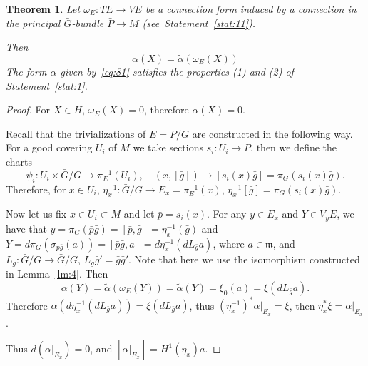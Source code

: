 \documentclass[12pt,letterpaper]{amsart}
\theoremstyle{definition}
\theoremstyle{plain}
\newtheorem{thm}{Theorem}
\theoremstyle{remark}
\begin{document}
\begin{thm}
Let $\omega_E: TE \rightarrow VE$ be a connection form induced by a connection in the principal $\bar{G}$-bundle $\bar{P} \to M$ (see~Statement~\ref{stat:11}). 

Then
\begin{equation}
\alpha(X)=\tilde{\alpha}(\omega_E(X))
\label{eq:81}
\end{equation}
The form $\alpha$ given by~\eqref{eq:81} satisfies the properties (1) and (2) of Statement~\ref{stat:1}.
\label{thm:4}
\end{thm}
\begin{proof}
For $X \in H$, $\omega_E(X) = 0$, therefore $\alpha(X) = 0$.

Recall that the trivializations of $E = P/G$ are constructed in the following way.
For a good covering $U_i$ of $M$ we take sections $s_i : U_i \to P$, then we define the charts
\begin{equation}
\psi_i : U_i \times \bar{G}/G \to \pi_E^{-1}(U_i), \quad (x, [\bar{g}]) \to [s_i(x) \bar{g}] = \pi_G(s_i(x) \bar{g}).
\label{eq:82}
\end{equation}
Therefore, for $x \in U_i$, $\eta_x^{-1} : \bar{G}/G \to E_x = \pi_E^{-1}(x)$, $\eta_x^{-1}[\bar{g}] = \pi_G(s_i(x)\bar{g})$.

Now let us fix $x \in U_i \subset M$ and let $\bar{p} = s_i(x)$.
For any $y \in E_x$ and $Y \in V_yE$, we have that $y = \pi_G(\bar{p} \bar{g}) = [\bar{p}, \bar{g}] = \eta_x^{-1}(\bar{g})$ and $Y = d\pi_G(\sigma_{\bar{p} \bar{g}}(a)) = [\bar{p} \bar{g}, a] = d\eta_x^{-1} (dL_{\bar{g}} a)$, where $a \in \mathfrak{m}$, and $L_{\bar{g}} : \bar{G}/G \to \bar{G}/G$, $L_{\bar{g}} \bar{g}' = \bar{g}\bar{g}'$.
Note that here we use the isomorphism constructed in Lemma~\ref{lm:4}. 
Then
\begin{equation}
\alpha(Y) = \widetilde{\alpha}(\omega_E(Y)) = \widetilde{\alpha}(Y) = \xi_0(a) = \xi(dL_{\bar{g}} a).
\label{eq:83}
\end{equation}
Therefore $\alpha(d\eta_x^{-1} (dL_{\bar{g}} a) ) = \xi(dL_{\bar{g}} a)$, thus $(\eta_x^{-1})^* \left.\alpha\right|_{E_x} = \xi$, then $\eta_x^* \xi = \left.\alpha\right|_{E_x}$.

Thus $d\left(\left.\alpha\right|_{E_x} \right) = 0$, and $\left[\left.\alpha\right|_{E_x} \right] = H^1(\eta_x) a$.
\end{proof}
\end{document}

